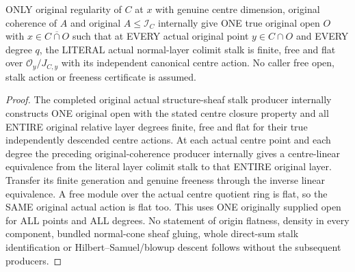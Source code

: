 \begin{theorem}
\label{hir:real-domain-original-all-actual-normal-layer-colimit-degrees-free-open}
\leanok
ONLY original regularity of $C$ at $x$ with genuine centre dimension,
original coherence of $A$ and original $A\leq\mathcal I_C$ internally
give ONE true original open $O$ with $x\in\overline{C\cap O}$ such that
at EVERY actual original point $y\in C\cap O$ and EVERY degree $q$,
the LITERAL actual normal-layer colimit stalk is finite, free and flat
over $\mathcal O_y/J_{C,y}$ with its independent canonical centre action.
No caller free open, stalk action or freeness certificate is assumed.
\end{theorem}
\begin{proof}
The completed original actual structure-sheaf stalk producer internally
constructs ONE original open with the stated centre closure property and
all ENTIRE original relative layer degrees finite, free and flat for their
true independently descended centre actions. At each actual centre point
and each degree the preceding original-coherence producer internally
gives a centre-linear equivalence from the literal layer colimit stalk
to that ENTIRE original layer. Transfer its finite generation and genuine
freeness through the inverse linear equivalence. A free module over the
actual centre quotient ring is flat, so the SAME original actual action
is flat too. This uses ONE originally supplied open for ALL points and
ALL degrees. No statement of origin flatness, density in every component,
bundled normal-cone sheaf gluing, whole direct-sum stalk identification or
Hilbert--Samuel/blowup descent follows without the subsequent producers.
\end{proof}
